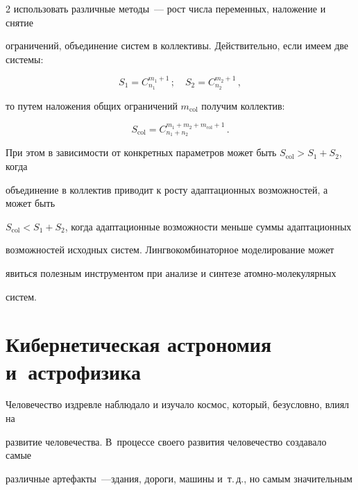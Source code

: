 \begin{multicols}{2}
использовать различные методы~--- рост чис\-ла переменных, наложение и снятие 


ограничений, объединение систем в коллективы. Действительно, если имеем две сис\-те\-мы:


      \begin{equation*}


      S_1=C_{n_1}^{m_1+1}\,;\quad S_2=C_{n_2}^{m_2+1}\,,




      \end{equation*}


то путем наложения общих ограничений $m_{\mathrm{col}}$ получим коллектив:


\begin{equation}


S_{\mathrm{col}} =C_{n_1+n_2}^{m_1+m_2+m_{\mathrm{col}}+1}\,.


\label{e17-ign}


\end{equation}


При этом в зависимости от конкретных параметров может быть $S_{\mathrm{col}} > S_1 + S_2$, когда 


объединение в коллектив приводит к росту адаптационных возможностей, а может быть 


$S_{\mathrm{col}} < S_1 + S_2$, когда адаптационные возможности меньше суммы адаптационных 


возможностей исходных систем. Линг\-во\-ком\-би\-на\-тор\-ное моделирование может 


явиться полезным инструментом при анализе и синтезе атом\-но-мо\-ле\-ку\-ляр\-ных 


сис\-тем.





\section{Кибернетическая астрономия и~астрофизика}





      Человечество издревле наблюдало и изучало космос, который, безусловно, влиял на 


развитие человечества. В~процессе своего развития человечество создавало самые 


различные артефакты~---\linebreak здания, дороги, машины и~т.\,д., но самым значительным 



\end{multicols}
